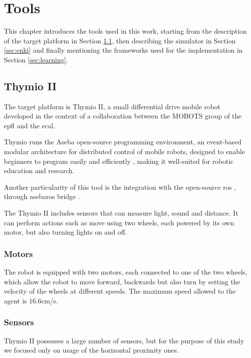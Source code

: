 \chapter{Tools}
\label{chap:impl}

This chapter introduces the tools used in this work, starting from the description 
of the target platform in Section \ref{sec:thymio}, then describing the simulator 
in Section \ref{sec:enki} and finally mentioning the frameworks used for the 
implementation in Section \ref{sec:learning}.

\section{Thymio II}
\label{sec:thymio}

The target platform is Thymio II, a small differential drive mobile robot developed 
in the context of a collaboration between the MOBOTS group of the \gls{epfl} and 
the \gls{ecal}. 

Thymio runs the Aseba open-source programming environment, an event-based 
modular architecture for distributed control of mobile robots, designed to enable 
beginners to program easily and efficiently \cite[][]{magnenat2010aseba, 
mondada2017bringing}, making it well-suited for robotic education and research.

Another particularity of this tool is the integration with the open-source 
\gls{ros} \cite[][]{quigley2009ros}, through asebaros bridge 
\cite[][]{asebaros}. 

The Thymio II includes sensors that can measure light, sound and distance. 
It can perform actions such as move using two wheels, each powered by its own 
motor, but also turning lights on and off.

\subsection{Motors}
\label{subsection:thymotors}
The robot is equipped with two motors, each connected to one of the two 
wheels, which allow the robot to move forward, backwards but also turn by 
setting the velocity of the wheels at different speeds. The maximum speed 
allowed 
to the agent is $16.6$cm/s.

\subsection{Sensors}
\label{subsec:thysensors}

Thymio II possesses a large number of sensors, but for the purpose of this 
study we focused only on usage of the horizontal proximity ones. 

